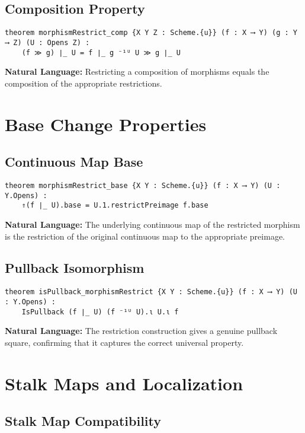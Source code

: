 \documentclass{article}
\theoremstyle{definition}
\begin{document}
\subsection{Composition Property}

\begin{lstlisting}
theorem morphismRestrict_comp {X Y Z : Scheme.{u}} (f : X ⟶ Y) (g : Y ⟶ Z) (U : Opens Z) :
    (f ≫ g) ∣_ U = f ∣_ g ⁻¹ᵁ U ≫ g ∣_ U
\end{lstlisting}

\textbf{Natural Language:} Restricting a composition of morphisms equals the composition of the appropriate restrictions.

\section{Base Change Properties}

\subsection{Continuous Map Base}

\begin{lstlisting}
theorem morphismRestrict_base {X Y : Scheme.{u}} (f : X ⟶ Y) (U : Y.Opens) :
    ⇑(f ∣_ U).base = U.1.restrictPreimage f.base
\end{lstlisting}

\textbf{Natural Language:} The underlying continuous map of the restricted morphism is the restriction of the original continuous map to the appropriate preimage.

\subsection{Pullback Isomorphism}

\begin{lstlisting}
theorem isPullback_morphismRestrict {X Y : Scheme.{u}} (f : X ⟶ Y) (U : Y.Opens) :
    IsPullback (f ∣_ U) (f ⁻¹ᵁ U).ι U.ι f
\end{lstlisting}

\textbf{Natural Language:} The restriction construction gives a genuine pullback square, confirming that it captures the correct universal property.

\section{Stalk Maps and Localization}

\subsection{Stalk Map Compatibility}
\end{document}
